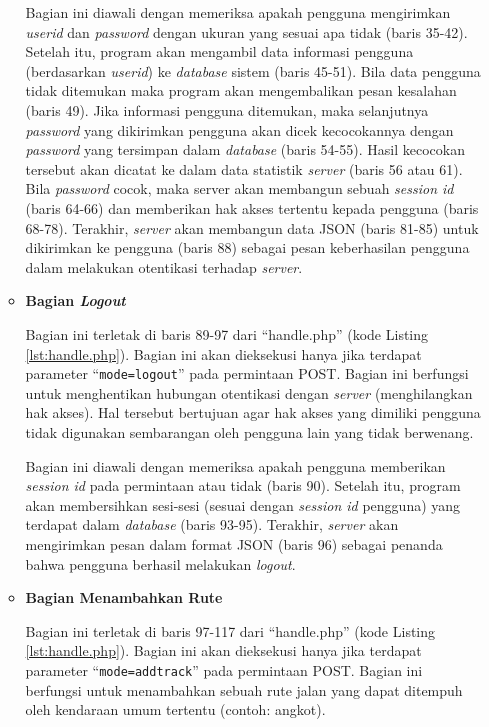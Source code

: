 \documentclass[a4paper,twoside]{article}
\begin{document}
\begin{enumerate}
\begin{itemize}
Bagian ini diawali dengan memeriksa apakah pengguna mengirimkan \textit{userid} dan \textit{password} dengan ukuran yang sesuai apa tidak (baris 35-42). Setelah itu, program akan mengambil data informasi pengguna (berdasarkan \textit{userid}) ke \textit{database} sistem (baris 45-51). Bila data pengguna tidak ditemukan maka program akan mengembalikan pesan kesalahan (baris 49). Jika informasi pengguna ditemukan, maka selanjutnya \textit{password} yang dikirimkan pengguna akan dicek kecocokannya dengan \textit{password} yang tersimpan dalam \textit{database} (baris 54-55). Hasil kecocokan tersebut akan dicatat ke dalam data statistik \textit{server} (baris 56 atau 61). Bila \textit{password} cocok, maka server akan membangun sebuah \textit{session id} (baris 64-66) dan memberikan hak akses tertentu kepada pengguna (baris 68-78). Terakhir, \textit{server} akan membangun data JSON (baris 81-85) untuk dikirimkan ke pengguna (baris 88) sebagai pesan keberhasilan pengguna dalam melakukan otentikasi terhadap \textit{server}.

\item \textbf{Bagian \textit{Logout}}

Bagian ini terletak di baris 89-97 dari ``handle.php'' (kode Listing \ref{lst:handle.php}). Bagian ini akan dieksekusi hanya jika terdapat parameter ``\texttt{mode=logout}'' pada permintaan POST. Bagian ini berfungsi untuk menghentikan hubungan otentikasi dengan \textit{server} (menghilangkan hak akses). Hal tersebut bertujuan agar hak akses yang dimiliki pengguna tidak digunakan sembarangan oleh pengguna lain yang tidak berwenang.

Bagian ini diawali dengan memeriksa apakah pengguna memberikan \textit{session id} pada permintaan atau tidak (baris 90). Setelah itu, program akan membersihkan sesi-sesi (sesuai dengan \textit{session id} pengguna) yang terdapat dalam \textit{database} (baris 93-95). Terakhir, \textit{server} akan mengirimkan pesan dalam format JSON (baris 96) sebagai penanda bahwa pengguna berhasil melakukan \textit{logout}.

\item \textbf{Bagian Menambahkan Rute}

Bagian ini terletak di baris 97-117 dari ``handle.php'' (kode Listing \ref{lst:handle.php}). Bagian ini akan dieksekusi hanya jika terdapat parameter ``\texttt{mode=addtrack}'' pada permintaan POST. Bagian ini berfungsi untuk menambahkan sebuah rute jalan yang dapat ditempuh oleh kendaraan umum tertentu (contoh: angkot).


\end{itemize}
\end{enumerate}
\end{document}
